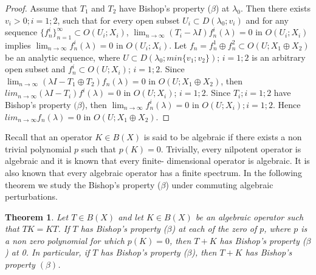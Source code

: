 \documentclass[12pt,a4paper]{amsart}
\newtheorem{theorem}{Theorem}[section]
\begin{document}
\begin{proof} Assume that $T_{1}$ and $T_{2}$ have Bishop's property ($\beta$) at $\lambda_{0}$. Then
there exists $v_{i} > 0; i = 1; 2$, such that for every open
subset $U_{i}\subset D(\lambda_{0}; v_{i})$ and for any sequence
$\{f^{i}_{n}\}^{\infty}_{n=1} \subset O(U_{i};X_{i})$,
$\lim_{n\rightarrow \infty}(T_{i}-\lambda I)f^{i}_{n} (\lambda) =
0$ in $O(U_{i};X_{i})$ implies $\lim_{n\rightarrow \infty}
f^{i}_{n}(\lambda) = 0$ in $O(U_{i};X_{i})$. Let $f_{n} = f^{1}_{
n} \oplus f^{2}_{ n}\subset O(U;X_{1} \oplus X_{2})$ be an
analytic sequence, where $U \subset D(\lambda_{0}; min\{v_{1};
v_{2}\})$; $i = 1; 2$ is an arbitrary open subset and $f^{i}_{n}
\subset O(U;X_{i})$; $i = 1; 2$. Since $\lim_{n\rightarrow
\infty}(\lambda I- T_{1} \oplus T_{2})f_{n}(\lambda) = 0$ in
$O(U;X_{1} \oplus X_{2})$, then $lim_{n\rightarrow\infty}(\lambda
I - T_{i})f^{i}_{} (\lambda) = 0$ in $O(U;X_{i})$; $i = 1; 2$.
Since $T_{i}; i = 1; 2$ have Bishop's property $(\beta$), then
$\lim_{n\rightarrow\infty} f^{i}_{n} (\lambda) = 0$ in
$O(U;X_{i}); i = 1; 2$. Hence $lim_{n\rightarrow \infty}
f_{n}(\lambda) = 0$ in $O(U;X_{1} \oplus X_{2})$.
\end{proof}
Recall that an operator $K \in B(X)$ is said to be algebraic if
there exists a non trivial polynomial $p$ such that $p(K) = 0$.
Trivially, every nilpotent operator is algebraic and it is known
that every finite- dimensional operator is algebraic. It is also
known that every algebraic operator has a finite spectrum. In the
following theorem we study the Bishop's property ($\beta$) under
commuting algebraic perturbations.
\begin{theorem} Let $T \in B(X)$ and let $K \in B(X)$ be an algebraic
operator such that $TK = KT$. If $T$ has Bishop's property
($\beta$) at each of the zero of $p$, where $p$ is a non zero
polynomial for which $p(K) = 0$, then $T + K$ has Bishop's
property ($\beta$) at 0. In particular, if $T$ has Bishop's
property ($\beta$), then $T + K$ has Bishop's property $(\beta)$.
\end{theorem}
\end{document}
